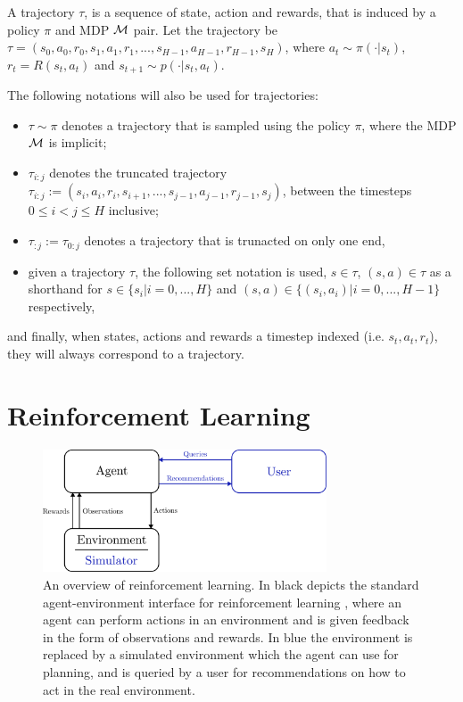     \begin{defn}
        \label{def:2:trajectory}
        A \textnormal{trajectory} $\tau$, is a sequence of state, action and rewards, that is induced by a policy $\pi$ and MDP $\mathcal{M}$ pair. Let the trajectory be $\tau = (s_0, a_0, r_0, s_1, a_1, r_1, ..., s_{H-1}, a_{H-1}, r_{H-1}, s_H)$, where $a_t \sim \pi(\cdot|s_t)$, $r_t=R(s_t,a_t)$ and $s_{t+1} \sim p(\cdot|s_t,a_t)$. 
        
        The following notations will also be used for trajectories:
        \begin{itemize}
            \item $\tau\sim\pi$ denotes a trajectory that is sampled using the policy $\pi$, where the MDP $\mathcal{M}$ is implicit;
            \item $\tau_{i:j}$ denotes the \textnormal{truncated trajectory} $\tau_{i:j}:=(s_i, a_i, r_i, s_{i+1}, ..., s_{j-1}, a_{j-1}, r_{j-1}, s_j)$, between the timesteps $0\leq i < j \leq H$ inclusive;
            \item $\tau_{:j}:=\tau_{0:j}$ denotes a trajectory that is trunacted on only one end,
            \item given a trajectory $\tau$, the following set notation is used, $s\in \tau$, $(s,a)\in\tau$ as a shorthand for $s\in\{s_i|i=0,...,H\}$ and $(s,a)\in\{(s_i,a_i)|i=0,...,H-1\}$ respectively, 
        \end{itemize}
        and finally, when states, actions and rewards a timestep indexed (i.e. $s_t,a_t,r_t$), they will always correspond to a trajectory.
    \end{defn}







\section{Reinforcement Learning}
\label{sec:2-3-rl}

    \begin{figure}
        \centering\includegraphics[width=0.75\textwidth]{figures/ch2/rl_overview.pdf} 
        \caption[An overview of reinforcement learning.]{An overview of reinforcement learning. In black depicts the standard agent-environment interface for reinforcement learning \cite{sutton}, where an agent can perform actions in an environment and is given feedback in the form of observations and rewards. In blue the environment is replaced by a simulated environment which the agent can use for planning, and is queried by a user for recommendations on how to act in the real environment.}
        \label{fig:2:rl_overview}
    \end{figure}


